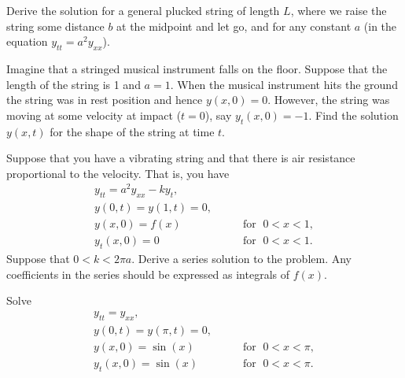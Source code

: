 \begin{exercise}
Derive the solution for a general plucked string of length $L$, where we
raise the string some distance $b$ at the midpoint and let go, and for any
constant $a$ (in the equation $y_{tt} = a^2 y_{xx}$).
\end{exercise}

\begin{exercise}
Imagine that a stringed musical instrument falls on the floor.  Suppose that
the length of the string is 1 and $a=1$.  When the musical instrument hits
the ground the string was in rest position and hence $y(x,0) = 0$.  However,
the string was moving at some velocity at impact ($t=0$),
say $y_t(x,0) = -1$.  Find the
solution
$y(x,t)$ for the shape of the string at time $t$.
\end{exercise}

\begin{exercise}[challenging]
Suppose that you have a vibrating string and that
there is air resistance proportional to the velocity.  That is, you have
\begin{equation*}
\begin{array}{ll}
y_{tt} = a^2 y_{xx} - k y_t , &  \\
y(0,t) = y(1,t) = 0 , &  \\
y(x,0) = f(x) & \qquad \text{for } \; 0 < x < 1 , \\
y_t(x,0) = 0 & \qquad \text{for } \; 0 < x < 1 .
\end{array}
\end{equation*}
Suppose that $0 < k < 2 \pi a$.
Derive a series solution to the problem.  Any coefficients in the series
should be expressed as integrals of $f(x)$.
\end{exercise}

\setcounter{exercise}{100}

\begin{exercise}
Solve
\begin{equation*}
\begin{array}{ll}
y_{tt} = y_{xx} , &  \\
y(0,t) = y(\pi,t) = 0 , &  \\
y(x,0) = \sin(x) & \qquad \text{for } \; 0 < x < \pi , \\
y_t(x,0) = \sin(x) & \qquad \text{for } \; 0 < x < \pi .
\end{array}
\end{equation*}
\end{exercise}

